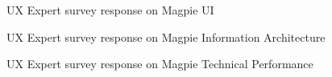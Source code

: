\begin{figure}
    \centering
    \caption{UX Expert survey response on Magpie UI}
\end{figure}
\begin{figure}
    \centering
    \caption{UX Expert survey response on Magpie Information Architecture}
\end{figure}
\begin{figure}
    \centering
    \caption{UX Expert survey response on Magpie Technical Performance}
\end{figure}
